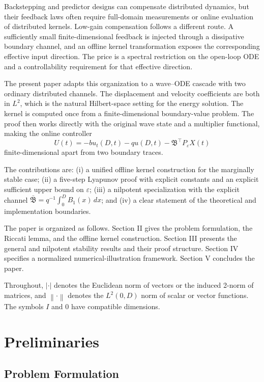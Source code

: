 \documentclass[journal]{IEEEtran}
\newcommand{\eps}{\varepsilon}
\newcommand{\Bcal}{\mathfrak B}
\newcommand{\Bbar}{\bar{\mathfrak B}}
\newcommand{\norm}[1]{\left\|#1\right\|}
\newcommand{\abs}[1]{\left|#1\right|}
\begin{document}
Backstepping and predictor designs can compensate distributed dynamics, but their feedback laws often require full-domain measurements or online evaluation of distributed kernels. Low-gain compensation follows a different route. A sufficiently small finite-dimensional feedback is injected through a dissipative boundary channel, and an offline kernel transformation exposes the corresponding effective input direction. The price is a spectral restriction on the open-loop ODE and a controllability requirement for that effective direction.

The present paper adapts this organization to a wave--ODE cascade with two ordinary distributed channels. The displacement and velocity coefficients are both in \(L^2\), which is the natural Hilbert-space setting for the energy solution. The kernel is computed once from a finite-dimensional boundary-value problem. The proof then works directly with the original wave state and a multiplier functional, making the online controller
\[
 U(t)=-b u_t(D,t)-q u(D,t)-\Bcal^\top P_\eps X(t)
\]
finite-dimensional apart from two boundary traces.

The contributions are: (i) a unified offline kernel construction for the marginally stable case; (ii) a five-step Lyapunov proof with explicit constants and an explicit sufficient upper bound on \(\eps\); (iii) a nilpotent specialization with the explicit channel \(\Bbar=q^{-1}\int_0^D B_1(x)\,dx\); and (iv) a clear statement of the theoretical and implementation boundaries.

The paper is organized as follows. Section II gives the problem formulation, the Riccati lemma, and the offline kernel construction. Section III presents the general and nilpotent stability results and their proof structure. Section IV specifies a normalized numerical-illustration framework. Section V concludes the paper.

Throughout, \(\abs{\cdot}\) denotes the Euclidean norm of vectors or the induced 2-norm of matrices, and \(\norm{\cdot}\) denotes the \(L^2(0,D)\) norm of scalar or vector functions. The symbols \(I\) and \(0\) have compatible dimensions.

\section{Preliminaries}

\subsection{Problem Formulation}
\end{document}
